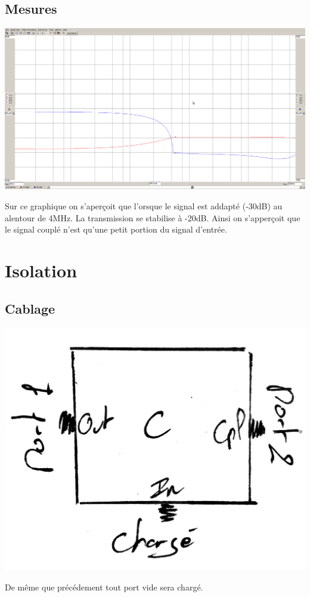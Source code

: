 \documentclass[a4paper,12pt]{report}            %
\begin{document}
\subsection{Mesures}
\begin{center}\includegraphics[scale = 0.25]{pic/cdic.png}\\\end{center}
Sur ce graphique on s'aperçoit que l'orsque le signal est addapté (-30dB) au alentour de 4MHz.
La transmission se stabilise à -20dB. Ainsi on s'apperçoit que le signal couplé n'est qu'une petit
portion du signal d'entrée.
\section{Isolation}
\subsection{Cablage}
\begin{center}\includegraphics[scale = 0.17]{pic/CDOP.png}\\ \end{center}
De même que précédement tout port vide sera chargé.
\newpage
\end{document}
